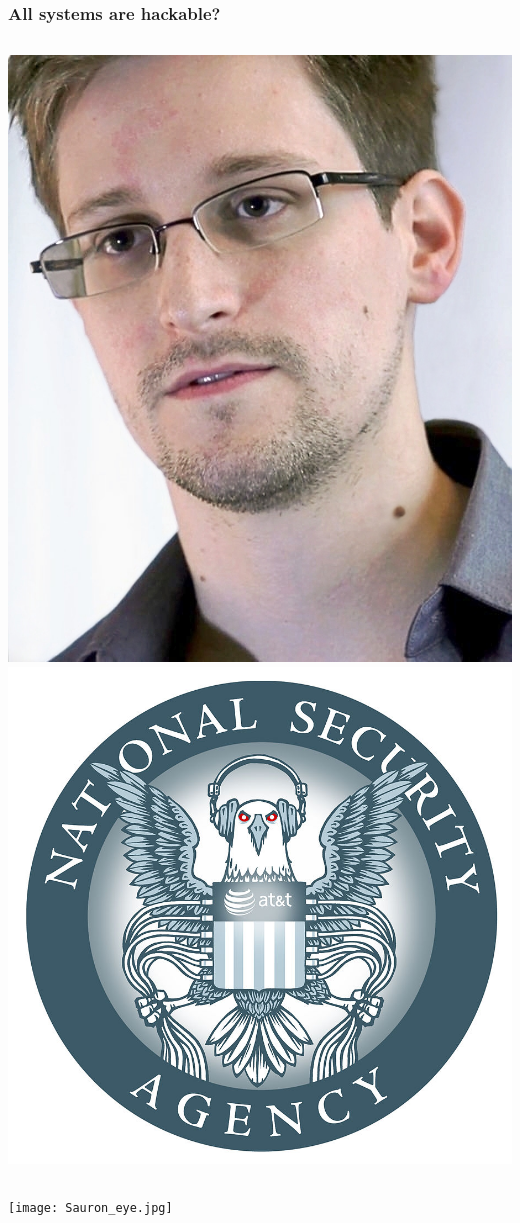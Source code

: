 \begin{frame}
  \frametitle{All systems are hackable?}
  \begin{columns}
    \includegraphics[width=\textwidth]{Edward_Snowden-2.jpg}
    \includegraphics[width=\textwidth]{EFF_version_of_NSA_logo.jpg}
  \end{columns}
  \texttt{[image: Sauron\_eye.jpg]}
\end{frame}

